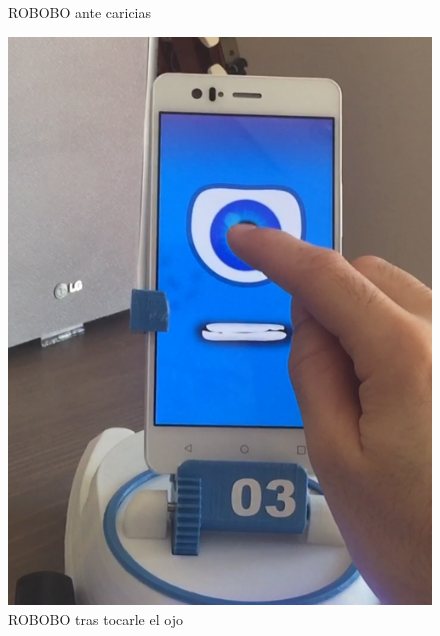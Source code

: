 \begin{figure}
\begin{minipage}{0.45\textwidth}
\caption{ROBOBO ante caricias}
\label{fig:pet_pet}

\end{minipage}
\end{figure}

\begin{figure}
\centering
\begin{minipage}{0.45\textwidth}
\centering
\includegraphics[width=1\linewidth]{imagenes/pet_eye.png}
\caption{ROBOBO tras tocarle el ojo}
\label{fig:pet_eye}


\end{minipage}
\end{figure}
